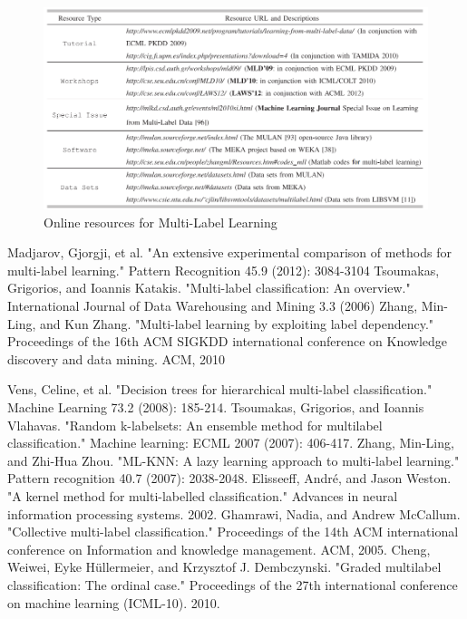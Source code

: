 \documentclass[12pt]{report}
\begin{document}
	\begin{figure}[H]
		\centering
		\includegraphics[width=1\textwidth]{online.png}
		\caption{Online resources for Multi-Label Learning}
    \label{figure:resources}
	\end{figure}
	
	\renewcommand\bibname{Related Work and Bibliography}
	\begin{thebibliography}{9}
		Madjarov, Gjorgji, et al. "An extensive experimental comparison of methods for multi-label learning." Pattern Recognition 45.9 (2012): 3084-3104
		 Tsoumakas, Grigorios, and Ioannis Katakis. "Multi-label classification: An overview." International Journal of Data Warehousing and Mining 3.3 (2006)
		 Zhang, Min-Ling, and Kun Zhang. "Multi-label learning by exploiting label dependency." Proceedings of the 16th ACM SIGKDD international conference on Knowledge discovery and data mining. ACM, 2010


 Vens, Celine, et al. "Decision trees for hierarchical multi-label classification." Machine Learning 73.2 (2008): 185-214.
 Tsoumakas, Grigorios, and Ioannis Vlahavas. "Random k-labelsets: An ensemble method for multilabel classification." Machine learning: ECML 2007 (2007): 406-417.
 Zhang, Min-Ling, and Zhi-Hua Zhou. "ML-KNN: A lazy learning approach to multi-label learning." Pattern recognition 40.7 (2007): 2038-2048.
 Elisseeff, André, and Jason Weston. "A kernel method for multi-labelled classification." Advances in neural information processing systems. 2002.
  Ghamrawi, Nadia, and Andrew McCallum. "Collective multi-label classification." Proceedings of the 14th ACM international conference on Information and knowledge management. ACM, 2005.
  Cheng, Weiwei, Eyke Hüllermeier, and Krzysztof J. Dembczynski. "Graded multilabel classification: The ordinal case." Proceedings of the 27th international conference on machine learning (ICML-10). 2010.
      
	\end{thebibliography}
\end{document}
